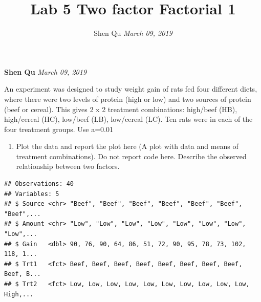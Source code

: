 \documentclass[11pt,]{article}
\title{Lab 5 Two factor Factorial 1  }
\author{\Large Shen Qu\vspace{0.05in} \newline\normalsize\emph{March 09, 2019}  }
\date{}
\newcommand*{\authorfont}{\fontfamily{phv}\selectfont}
\renewenvironment{abstract}
 {{%
    \setlength{\leftmargin}{0mm}
    \setlength{\rightmargin}{\leftmargin}%
  }%
  \relax}
 {\endlist}
\providecommand{\tightlist}{%
\setlength{\itemsep}{0pt}\setlength{\parskip}{0pt}}
\begin{document}
	
%

{%
\setlength{\parindent}{0pt}
\thispagestyle{plain}
{\fontsize{18}{20}\selectfont\raggedright 
\maketitle  %

}

{
   \vskip 13.5pt\relax \normalsize\fontsize{11}{12} 
\textbf{\authorfont Shen Qu} \hskip 15pt \emph{\small March 09, 2019}   

}

}








\begin{abstract}

    \hbox{\vrule height .2pt width 39.14pc}

    \vskip 8.5pt %

\noindent An experiment was designed to study weight gain of rats fed four
different diets, where there were two levels of protein (high or low)
and two sources of protein (beef or cereal). This gives 2 x 2 treatment
combinations: high/beef (HB), high/cereal (HC), low/beef (LB),
low/cereal (LC). Ten rats were in each of the four treatment groups. Use
a=0.01


    \hbox{\vrule height .2pt width 39.14pc}


\end{abstract}


\vskip 6.5pt


\noindent  \begin{enumerate}
\def\labelenumi{(\alph{enumi})}
\tightlist
\item
  Plot the data and report the plot here (A plot with data and means of
  treatment combinations). Do not report code here. Describe the
  observed relationship between two factors.
\end{enumerate}

\begin{verbatim}
## Observations: 40
## Variables: 5
## $ Source <chr> "Beef", "Beef", "Beef", "Beef", "Beef", "Beef", "Beef",...
## $ Amount <chr> "Low", "Low", "Low", "Low", "Low", "Low", "Low", "Low",...
## $ Gain   <dbl> 90, 76, 90, 64, 86, 51, 72, 90, 95, 78, 73, 102, 118, 1...
## $ Trt1   <fct> Beef, Beef, Beef, Beef, Beef, Beef, Beef, Beef, Beef, B...
## $ Trt2   <fct> Low, Low, Low, Low, Low, Low, Low, Low, Low, Low, High,...
\end{verbatim}
\end{document}
